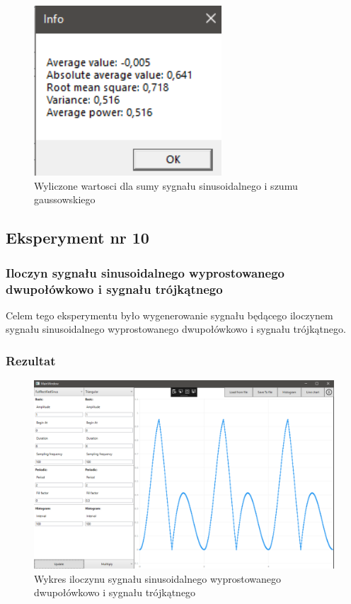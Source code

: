 \documentclass[12pt]{article}
\begin{document}
\begin{figure}[H]
 \centering
 \includegraphics[width=7cm]{images/addsingauss1info.PNG}
 \vspace{-0.3cm}
 \caption{Wyliczone wartosci dla  sumy sygnału sinusoidalnego i szumu gaussowskiego}
 \label{gui}
\end{figure}



\subsection{Eksperyment nr 10 }
\subsubsection{Iloczyn sygnału sinusoidalnego wyprostowanego dwupołówkowo i sygnału trójkątnego}
Celem tego eksperymentu było wygenerowanie sygnału będącego iloczynem sygnału sinusoidalnego wyprostowanego dwupołówkowo i sygnału trójkątnego.


\subsubsection{Rezultat}

\begin{figure}[H]
 \centering
 \includegraphics[width=14cm]{images/mulfulltrian1.PNG}
 \vspace{-0.3cm}
 \caption{Wykres  iloczynu sygnału sinusoidalnego wyprostowanego dwupołówkowo i sygnału trójkątnego}
 \label{gui}
\end{figure}
\end{document}
